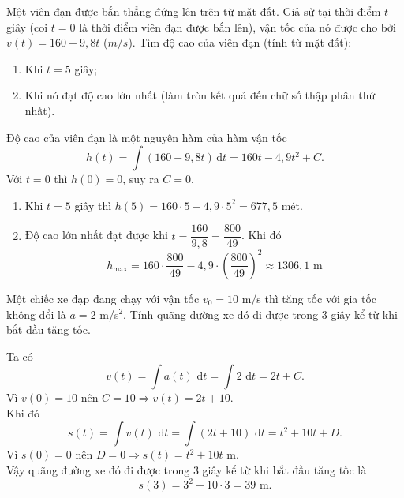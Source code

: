 \documentclass[12pt,aspectratio=169]{beamer}
\begin{document}
\begin{baitap}%
	Một viên đạn được bắn thẳng đứng lên trên từ mặt đất. Giả sử tại thời điểm $t$ giây (coi $t = 0$ là thời điểm viên đạn được bắn lên), vận tốc của nó được cho bởi $v(t) = 160-9{,}8t$ ($m/s$). Tìm độ cao của viên đạn (tính từ mặt đất):
	\begin{enumerate}
		\item Khi $t = 5$ giây;
		\item Khi nó đạt độ cao lớn nhất (làm tròn kết quả đến chữ số thập phân thứ nhất).
	\end{enumerate}

	\begin{loigiai}
		Độ cao của viên đạn là một nguyên hàm của hàm vận tốc
		\[h(t)=\int (160-9{,}8t)\mathrm{\,d}t=160t-4{,}9t^2+C. \]
		Với $ t=0 $ thì $ h(0)=0 $, suy ra $ C=0 $.
		\begin{enumerate}
			\item Khi $ t=5 $ giây thì $ h(5)=160\cdot 5-4{,}9\cdot 5^2=677{,5} $ mét.
			\item Độ cao lớn nhất đạt được khi $ t=\dfrac{160}{9{,}8}=\dfrac{800}{49} $. Khi đó
			\[h_{\max}=160\cdot \dfrac{800}{49}-4{,}9\cdot \left(\dfrac{800}{49} \right) ^2\approx 1306{,}1 \text{ m}\]
		\end{enumerate}
	\end{loigiai}
\end{baitap}

\begin{baitap}%
	Một chiếc xe đạp đang chạy với vận tốc $v_0=10$ m/s thì tăng tốc với gia tốc không đổi là $a=2$ m/s$^2$. Tính quãng đường xe đó đi được trong $3$ giây kể từ khi bắt đầu tăng tốc.

	\begin{loigiai}
		Ta có
		\[v(t)=\displaystyle\int{a(t)\text{ d}t=}\displaystyle\int{2\text{ d}t=2t+C}.\]
		Vì $v(0)=10$ nên $C=10\Rightarrow v(t)=2t+10$.\\
		Khi đó
		\[s(t)=\displaystyle\int{v(t)\text{ d}t=}\displaystyle\int{\left(2t+10\right)\text{ d}t=t^2+10t+D}.\]
		Vì $s(0)=0$	nên	$D=0\Rightarrow s(t)=t^2+10t$ m.\\
		Vậy quãng đường xe đó đi được trong $3$ giây kể từ khi bắt đầu tăng tốc là \[s(3)=3^2+10\cdot3=39 \text{ m}.\]
	\end{loigiai}
\end{baitap}
\end{document}
